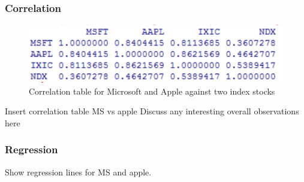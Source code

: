 \documentclass[paper=a4, fontsize=11pt]{scrartcl} %
\numberwithin{equation}{section} %
\numberwithin{figure}{section} %
\numberwithin{table}{section} %
\begin{document}
\subsubsection{Correlation}

\begin{figure}[!htb]
  \includegraphics[width=\linewidth]{graph/cor8.png}
  \caption{Correlation table for Microsoft and Apple against two index stocks}
\endminipage\hfill
\end{figure}

Insert correlation table MS vs apple
Discuss any interesting overall observations here

\subsubsection{Regression}
Show regression lines for MS and apple. 
\end{document}

